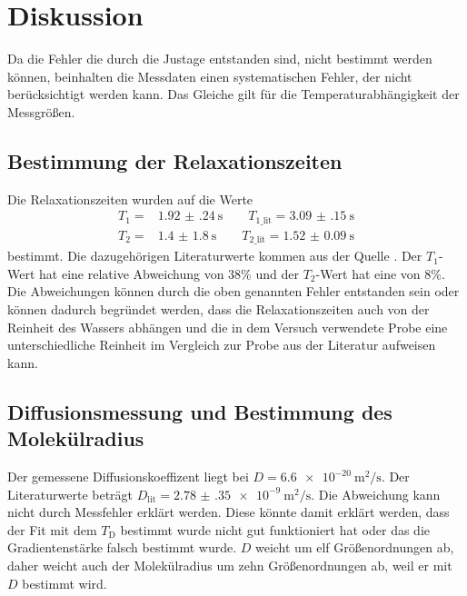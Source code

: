 \section{Diskussion}
\label{sec:Diskussion}
Da die Fehler die durch die Justage entstanden sind, nicht bestimmt werden können, beinhalten die Messdaten 
einen systematischen Fehler, der nicht berücksichtigt werden kann. Das Gleiche gilt für die Temperaturabhängigkeit 
der Messgrößen.
\subsection{Bestimmung der Relaxationszeiten}
Die Relaxationszeiten wurden auf die Werte 
\begin{align}
    T_{\text{1}}=& \SI{1.92(24)}{\second} \qquad T_{\text{1\_lit}}= \SI{3.09(15)}{\second}\\
    T_{\text{2}}=& \SI{1.4(18)}{\second} \qquad T_{\text{2\_lit}}= \SI{1.52(9)}{\second}
\end{align}
bestimmt.
Die dazugehörigen Literaturwerte kommen aus der Quelle \cite{Quelle_8}. Der $T_{\text{1}}$-Wert hat eine relative Abweichung 
von 38\% und der $T_{\text{2}}$-Wert hat eine von 8\%. Die Abweichungen können durch die oben genannten Fehler entstanden sein oder können dadurch begründet werden,
dass die Relaxationszeiten auch von der Reinheit des Wassers abhängen und die in dem Versuch verwendete Probe eine unterschiedliche Reinheit im Vergleich zur 
Probe aus der Literatur aufweisen kann.
\subsection{Diffusionsmessung und Bestimmung des Molekülradius}
Der gemessene Diffusionskoeffizent liegt bei $D=\SI{6.6e-20}{\square\meter\per\second}$. Der Literaturwerte beträgt 
$D_{\text{lit}}= \SI{2.78(35)e-9}{\square\meter\per\second}$. Die Abweichung kann nicht durch Messfehler erklärt werden.
Diese könnte damit erklärt werden, dass der Fit mit dem $T_{\text{D}}$ bestimmt wurde nicht gut funktioniert hat oder 
das die Gradientenstärke falsch bestimmt wurde.
$D$ weicht um elf Größenordnungen ab, daher weicht auch der Molekülradius um zehn Größenordnungen ab, weil er mit $D$ bestimmt wird.
